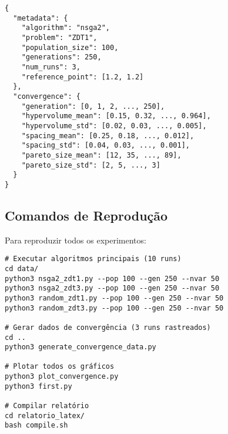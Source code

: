 \begin{verbatim}
{
  "metadata": {
    "algorithm": "nsga2",
    "problem": "ZDT1",
    "population_size": 100,
    "generations": 250,
    "num_runs": 3,
    "reference_point": [1.2, 1.2]
  },
  "convergence": {
    "generation": [0, 1, 2, ..., 250],
    "hypervolume_mean": [0.15, 0.32, ..., 0.964],
    "hypervolume_std": [0.02, 0.03, ..., 0.005],
    "spacing_mean": [0.25, 0.18, ..., 0.012],
    "spacing_std": [0.04, 0.03, ..., 0.001],
    "pareto_size_mean": [12, 35, ..., 89],
    "pareto_size_std": [2, 5, ..., 3]
  }
}
\end{verbatim}

\subsection{Comandos de Reprodução}

Para reproduzir todos os experimentos:

\begin{verbatim}
# Executar algoritmos principais (10 runs)
cd data/
python3 nsga2_zdt1.py --pop 100 --gen 250 --nvar 50
python3 nsga2_zdt3.py --pop 100 --gen 250 --nvar 50
python3 random_zdt1.py --pop 100 --gen 250 --nvar 50
python3 random_zdt3.py --pop 100 --gen 250 --nvar 50

# Gerar dados de convergência (3 runs rastreados)
cd ..
python3 generate_convergence_data.py

# Plotar todos os gráficos
python3 plot_convergence.py
python3 first.py

# Compilar relatório
cd relatorio_latex/
bash compile.sh
\end{verbatim}
